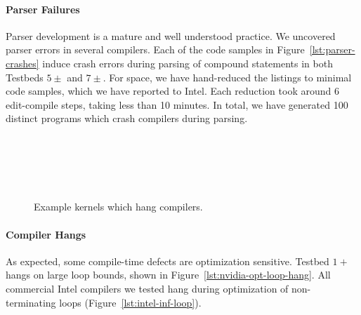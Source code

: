\paragraph{Parser Failures}

Parser development is a mature and well understood practice. We uncovered parser
errors in several compilers. Each of the code samples in
Figure~\ref{lst:parser-crashes} induce crash errors during parsing of compound
statements in both Testbeds $5\pm$ and $7\pm$. For space, we have hand-reduced
the listings to minimal code samples, which we have reported to Intel. Each
reduction took around 6 edit-compile steps, taking less than 10 minutes. In
total, we have generated 100 distinct programs which crash compilers during
parsing.

\begin{figure}
  \centering %
  \\%
  \\%
  \\%
  \\%
  \caption{Example kernels which hang compilers.}%
  \label{lst:compiler-hangs}
\end{figure}

\paragraph{Compiler Hangs}

As expected, some compile-time defects are optimization sensitive. Testbed $1+$
hangs on large loop bounds, shown in Figure~\ref{lst:nvidia-opt-loop-hang}. All
commercial Intel compilers we tested hang during optimization of non-terminating
loops (Figure~\ref{lst:intel-inf-loop}).

